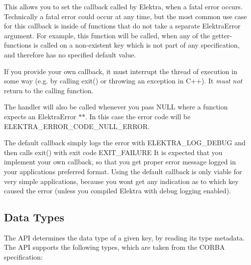 This allows you to set the callback called by Elektra, when a fatal error occurs. Technically a fatal error could occur at any time, but the most common use case for this callback is inside of functions that do not take a separate {\ttfamily Elektra\+Error} argument. For example, this function will be called, when any of the getter-\/functions is called on a non-\/existent key which is not part of any specification, and therefore has no specified default value.

If you provide your own callback, it must interrupt the thread of execution in some way (e.\+g. by calling {\ttfamily exit()} or throwing an exception in C++). It {\itshape must not} return to the calling function.

The handler will also be called whenever you pass {\ttfamily N\+U\+LL} where a function expects an {\ttfamily Elektra\+Error $\ast$$\ast$}. In this case the error code will be {\ttfamily E\+L\+E\+K\+T\+R\+A\+\_\+\+E\+R\+R\+O\+R\+\_\+\+C\+O\+D\+E\+\_\+\+N\+U\+L\+L\+\_\+\+E\+R\+R\+OR}.

The default callback simply logs the error with {\ttfamily E\+L\+E\+K\+T\+R\+A\+\_\+\+L\+O\+G\+\_\+\+D\+E\+B\+UG} and then calls {\ttfamily exit()} with exit code {\ttfamily E\+X\+I\+T\+\_\+\+F\+A\+I\+L\+U\+RE} It is expected that you implement your own callback, so that you get proper error message logged in your applications preferred format. Using the default callback is only viable for very simple applications, because you won\textquotesingle{}t get any indication as to which key caused the error (unless you compiled Elektra with debug logging enabled).

\label{_data-types}%


\subsection*{Data Types}

The A\+PI determines the data type of a given key, by reading its {\ttfamily type} metadata. The A\+PI supports the following types, which are taken from the C\+O\+R\+BA specification\+:


